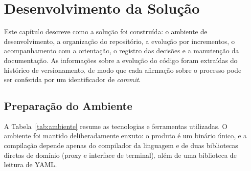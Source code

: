 \chapter{Desenvolvimento da Solução}\label{chp:dev}

Este capítulo descreve como a solução foi construída: o ambiente de desenvolvimento, a organização do repositório, a evolução por incrementos, o acompanhamento com a orientação, o registro das decisões e a manutenção da documentação. As informações sobre a evolução do código foram extraídas do histórico de versionamento, de modo que cada afirmação sobre o processo pode ser conferida por um identificador de \textit{commit}.

\section{Preparação do Ambiente}
\label{sec:dev_ambiente}

A Tabela~\ref{tab:ambiente} resume as tecnologias e ferramentas utilizadas. O ambiente foi mantido deliberadamente enxuto: o produto é um binário único, e a compilação depende apenas do compilador da linguagem e de duas bibliotecas diretas de domínio (proxy e interface de terminal), além de uma biblioteca de leitura de YAML.

